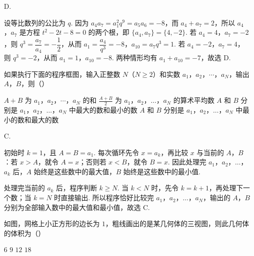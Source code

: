 \begin{answer}
D.
\end{answer}

\begin{solution}
设等比数列的公比为 \(q\). 因为 \(a_4a_7=a_1^2q^9=a_5a_6=-8\)，而 \(a_4+a_7=2\)，所以 \(a_4\)，\(a_7\) 是方程 \(t^2-2t-8=0\) 的两个根，即 \(\{a_4,a_7\}=\{4,-2\}\). 若 \(a_4=4\)，\(a_7=-2\)，则 \(q^3=\dfrac{a_7}{a_4}=-\dfrac12\)，从而 \(a_1=\dfrac{a_4}{q^3}=-8\)，\(a_{10}=a_7q^3=1\). 若 \(a_4=-2\)，\(a_7=4\)，则 \(q^3=-2\)，从而 \(a_1=1\)，\(a_{10}=-8\). 两种情形均有 \(a_1+a_{10}=-7\)，故选 D.
\end{solution}

\begin{problem}
如果执行下面的程序框图，输入正整数 \(N\)（\(N \geqslant 2\)）和实数 \(a_{1}\)，\(a_{2}\)，\(\cdots\)，\(a_{N}\)，输出 \(A\)，\(B\)，则（\quad）


\choices
    {\(A + B\) 为 \(a_{1}\)，\(a_{2}\)，\(\cdots\)，\(a_{N}\) 的和}
    {\(\frac{A + B}{2}\) 为 \(a_1\)，\(a_2\)，\(\dots\)，\(a_N\) 的算术平均数}
    {\(A\) 和 \(B\) 分别是 \(a_{1}\)，\(a_{2}\)，\(\dots\)，\(a_{N}\) 中最大的数和最小的数}
    {\(A\) 和 \(B\) 分别是 \(a_{1}\)，\(a_{2}\)，\(\dots\)，\(a_{N}\) 中最小的数和最大的数}
\end{problem}

\begin{answer}
C.
\end{answer}

\begin{solution}
初始时 \(k=1\)，且 \(A=B=a_1\). 每次循环先令 \(x=a_k\)，再比较 \(x\) 与当前的 \(A\)，\(B\)：若 \(x>A\)，就令 \(A=x\)；否则若 \(x<B\)，就令 \(B=x\). 因此处理完 \(a_1\)，\(a_2\)，\(\dots\)，\(a_k\) 后，\(A\) 始终是这些数中的最大值，\(B\) 始终是这些数中的最小值.

处理完当前的 \(a_k\) 后，程序判断 \(k\geqslant N\). 当 \(k<N\) 时，先令 \(k=k+1\)，再处理下一个数；当 \(k=N\) 时直接输出. 所以程序恰好比较完 \(a_1\)，\(a_2\)，\(\dots\)，\(a_N\)，输出的 \(A\)，\(B\) 分别为全部输入数中的最大值和最小值，故选 C.
\end{solution}

\begin{problem}
如图，网格上小正方形的边长为 \(1\)，粗线画出的是某几何体的三视图，则此几何体的体积为（\quad）


\choices
    {\(6\)}
    {\(9\)}
    {\(12\)}
    {\(18\)}
\end{problem}

